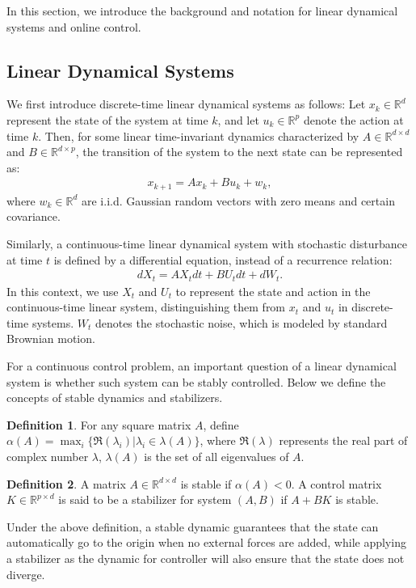 \documentclass{article}
\theoremstyle{definition}
\newtheorem{definition}{Definition}
\begin{document}
In this section, we introduce the background and notation for linear dynamical systems and online control. 

\subsection{Linear Dynamical Systems}\label{subsection: linear dynamical system}

We first introduce discrete-time linear dynamical systems as follows: Let $x_{k} \in \mathbb{R}^{d}$ represent the state of the system at time $k$, and let $u_{k} \in \mathbb{R}^{p}$ denote the action at time $k$. Then, for some linear time-invariant dynamics characterized by $A \in \mathbb{R}^{d \times d}$ and $B \in \mathbb{R}^{d \times p}$, the transition of the system to the next state can be represented as:
\begin{align}
x_{k+1} = Ax_{k} + Bu_{k} + w_{k},
\label{equ:discrete}
\end{align}
where $w_{k} \in \mathbb{R}^{d}$ are i.i.d. Gaussian random vectors with zero means and certain covariance.

Similarly, a continuous-time linear dynamical system with stochastic disturbance at time $t$ is defined by a differential equation, instead of a recurrence relation:
\begin{align}
dX_{t} = AX_{t}dt + BU_{t}dt + dW_{t}.
\label{equ:differential}
\end{align}
In this context, we use $X_t$ and $U_t$ to represent the state and action in the continuous-time linear system, distinguishing them from $x_t$ and $u_t$ in discrete-time systems. $W_{t}$ denotes the stochastic noise, which is modeled by standard Brownian motion.

For a continuous control problem, an important question of a linear dynamical system is whether such system can be stably controlled. Below we define the concepts of stable dynamics and stabilizers.

\begin{definition}\label{def:alpha}
For any square matrix $A$, define $\alpha(A)=\max_{i}\{\Re(\lambda_{i})\vert \lambda_{i}\in \lambda(A)  \}$, where $\Re(\lambda)$ represents the real part of complex number $\lambda$, $\lambda(A)$ is the set of all eigenvalues of $A$.    
\end{definition}

\begin{definition}\label{def:stable}
A matrix $A\in \mathbb{R}^{d\times d}$ is stable if $\alpha(A)<0$. A control matrix $K\in \mathbb{R}^{p\times d}$ is said to be a stabilizer for system $(A,B)$ if $A+BK$ is stable. 
\end{definition}
Under the above definition, a stable dynamic guarantees that the state can automatically go to the origin when no external forces are added, while applying a stabilizer as the dynamic for controller will also ensure that the state does not diverge.
\end{document}
